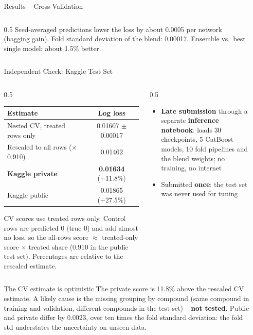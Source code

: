 \documentclass[9pt,aspectratio=169]{beamer}
\begin{document}
\begin{frame}{Results -- Cross-Validation}
\begin{columns}[T]
\begin{column}{0.5\textwidth}
      \vspace{2mm}
      \scriptsize Seed-averaged predictions lower the loss by about 0.0005 per network (bagging gain). Fold standard deviation of the blend: 0.00017. Ensemble vs.\ best single model: about 1.5\% better.
    \end{column}
  \end{columns}
\end{frame}

\begin{frame}{Independent Check: Kaggle Test Set}
  \begin{columns}[T]
    \begin{column}{0.5\textwidth}
      \centering
      \small
      \begin{tabular}{@{}lc@{}}
        \toprule
        \textbf{Estimate} & \textbf{Log loss} \\
        \midrule
        Nested CV, treated rows only & 0.01607 $\pm$ 0.00017 \\
        Rescaled to all rows ($\times$ 0.910) & 0.01462 \\
        \textbf{Kaggle private} & \textbf{0.01634} (+11.8\%) \\
        Kaggle public & 0.01865 (+27.5\%) \\
        \bottomrule
      \end{tabular}

      \vspace{2mm}
      \scriptsize CV scores use treated rows only. Control rows are predicted 0 (true 0) and add almost no loss, so the all-rows score $\approx$ treated-only score $\times$ treated share (0.910 in the public test set). Percentages are relative to the rescaled estimate.
    \end{column}
    \begin{column}{0.5\textwidth}
      \begin{itemize}
        \item \textbf{Late submission} through a separate \textbf{inference notebook}: loads 30 checkpoints, 5 CatBoost models, 10 fold pipelines and the blend weights; no training, no internet
        \item Submitted \textbf{once}; the test set was never used for tuning
      \end{itemize}
    \end{column}
  \end{columns}
  \vspace{2mm}
  \begin{alertblock}{The CV estimate is optimistic}
    \small The private score is 11.8\% above the rescaled CV estimate. A likely cause is the missing grouping by compound (same compound in training and validation, different compounds in the test set) -- \textbf{not tested}. Public and private differ by 0.0023, over ten times the fold standard deviation: the fold std understates the uncertainty on unseen data.
  \end{alertblock}
\end{frame}
\end{document}
